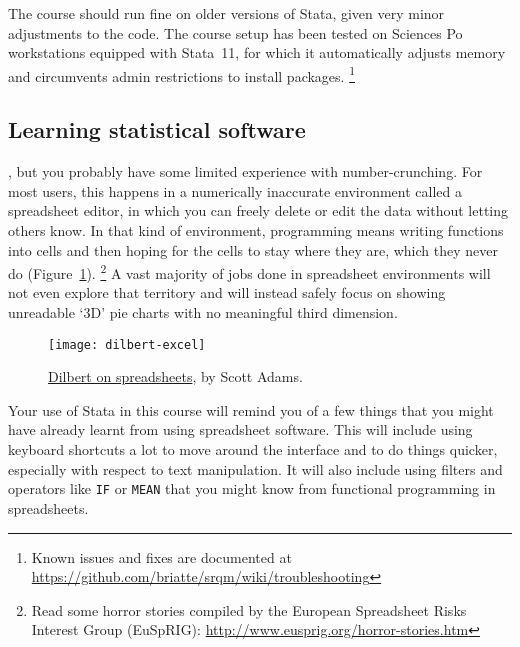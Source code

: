 	The course should run fine on older versions of Stata, given very minor adjustments to the code. The course setup has been tested on Sciences Po workstations equipped with Stata~11, for which it automatically adjusts memory and circumvents admin restrictions to install packages.%
  \footnote{Known issues and fixes are documented at %
		\url{https://github.com/briatte/srqm/wiki/troubleshooting}}%
		
		
%
\subsection{Learning statistical software}%
	, but you probably have some limited experience with number-crunching. For most users, this happens in a numerically inaccurate environment called a spreadsheet editor, in which you can freely delete or edit the data without letting others know. In that kind of environment, programming means writing functions into cells and then hoping for the cells to stay where they are, which they never do (Figure~\ref{fig:dilbert-spreadsheets}).%
		\footnote{Read some horror stories compiled by the European Spreadsheet %
		Risks Interest Group (EuSpRIG): %
		\url{http://www.eusprig.org/horror-stories.htm}} %
		A vast majority of jobs done in spreadsheet environments will not even explore that territory and will instead safely focus on showing unreadable `3D' pie charts with no meaningful third dimension.%

		\begin{figure}
			\texttt{[image: dilbert-excel]}
		  \caption{\href{http://dilbert.com/strips/comic/2007-08-08/}{Dilbert on spreadsheets}, by Scott Adams.}%
		  \label{fig:dilbert-spreadsheets}%
		\end{figure}

	Your use of Stata in this course will remind you of a few things that you might have already learnt from using spreadsheet software. This will include using keyboard shortcuts a lot to move around the interface and to do things quicker, especially with respect to text manipulation. It will also include using filters and operators like \texttt{IF} or \texttt{MEAN} that you might know from functional programming in spreadsheets.%
	
